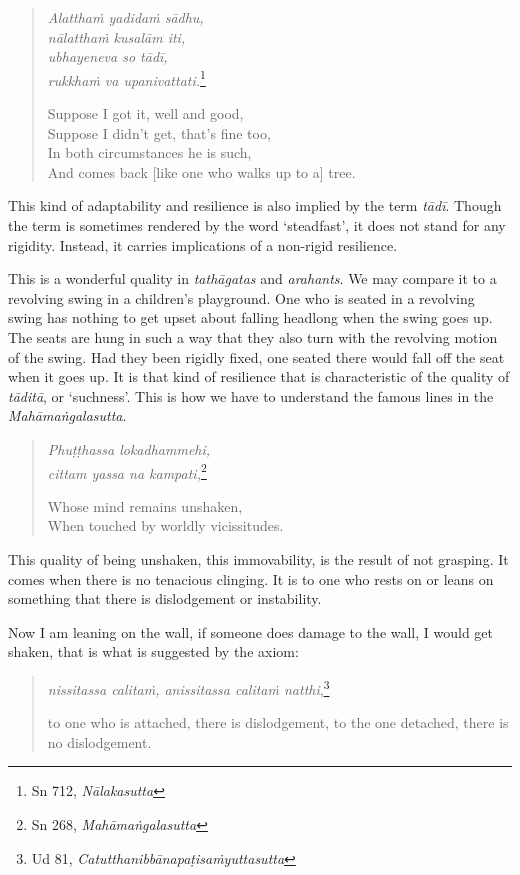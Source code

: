 \begin{quote}
\emph{Alatthaṁ yadidaṁ sādhu,}\\
\emph{nālatthaṁ kusalām iti,}\\
\emph{ubhayeneva so tādī,}\\
\emph{rukkhaṁ va upanivattati.}\footnote{Sn 712, \emph{Nālakasutta}}

Suppose I got it, well and good,\\
Suppose I didn't get, that's fine too,\\
In both circumstances he is such,\\
And comes back [like one who walks up to a] tree.
\end{quote}

This kind of adaptability and resilience is also implied by the term \emph{tādī}. Though the term is sometimes rendered by the word `steadfast', it does not stand for any rigidity. Instead, it carries implications of a non-rigid resilience.

This is a wonderful quality in \emph{tathāgatas} and \emph{arahants}. We may compare it to a revolving swing in a children's playground. One who is seated in a revolving swing has nothing to get upset about falling headlong when the swing goes up. The seats are hung in such a way that they also turn with the revolving motion of the swing. Had they been rigidly fixed, one seated there would fall off the seat when it goes up. It is that kind of resilience that is characteristic of the quality of \emph{tāditā}, or `suchness'. This is how we have to understand the famous lines in the \emph{Mahāmaṅgalasutta}.

\begin{quote}
\emph{Phuṭṭhassa lokadhammehi,}\\
\emph{cittam yassa na kampati,}\footnote{Sn 268, \emph{Mahāmaṅgalasutta}}

Whose mind remains unshaken,\\
When touched by worldly vicissitudes.
\end{quote}

This quality of being unshaken, this immovability, is the result of not grasping. It comes when there is no tenacious clinging. It is to one who rests on or leans on something that there is dislodgement or instability.

Now I am leaning on the wall, if someone does damage to the wall, I would get shaken, that is what is suggested by the axiom:

\begin{quote}
\emph{nissitassa calitaṁ, anissitassa calitaṁ natthi},\footnote{Ud 81, \emph{Catutthanibbānapaṭisaṁyuttasutta}}

to one who is attached, there is dislodgement, to the one detached, there is no dislodgement.
\end{quote}

